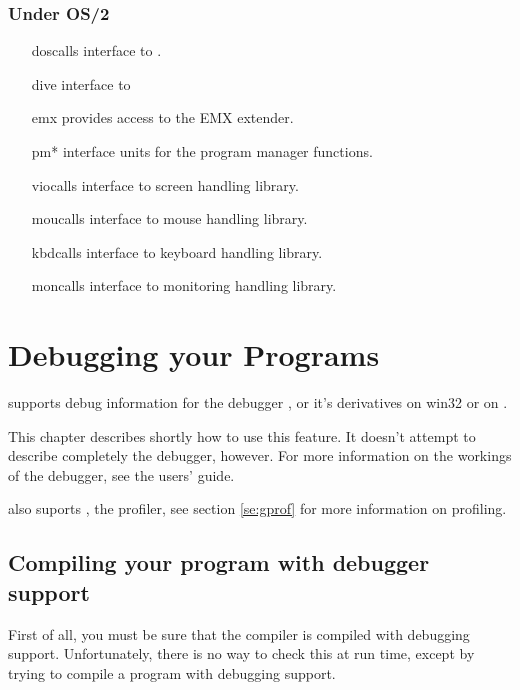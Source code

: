 \documentclass{book}
\begin{document}
\subsection{Under OS/2}
\begin{itemize}
\item [doscalls] interface to .
\item [dive] interface to 
\item [emx] provides access to the EMX extender.
\item [pm*] interface units for the program manager functions.
\item [viocalls] interface to  screen handling library.
\item [moucalls] interface to  mouse handling library.
\item [kbdcalls] interface to  keyboard handling library.
\item [moncalls] interface to  monitoring handling library.
\end{itemize}


\chapter{Debugging your Programs}

\fpc supports debug information for the \gnu debugger , or
it's derivatives  on win32 or  on \linux.

This chapter describes shortly how to use this feature. It doesn't attempt
to describe completely the \gnu debugger, however.
For more information on the workings of the \gnu debugger, see the 
users' guide.

\fpc also suports , the \gnu profiler, see section \ref{se:gprof}
for more information on profiling.

\section{Compiling your program with debugger support}
First of all, you must be sure that the compiler is compiled with debugging
support. Unfortunately, there is no way to check this at run time, except by
trying to compile a program with debugging support.
\end{document}
